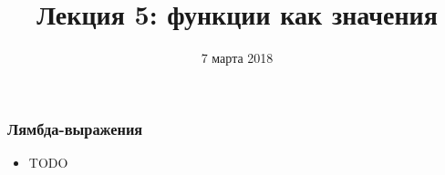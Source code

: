 \documentclass[10pt]{beamer}
\title{Лекция 5: функции как значения}
\date{7 марта 2018}
\begin{document}
\begin{frame}[plain]
\maketitle
\end{frame}

\begin{frame}[fragile]
\frametitle{Лямбда-выражения}
\begin{itemize}
    \item TODO
\end{itemize}
\end{frame}
\end{document}

